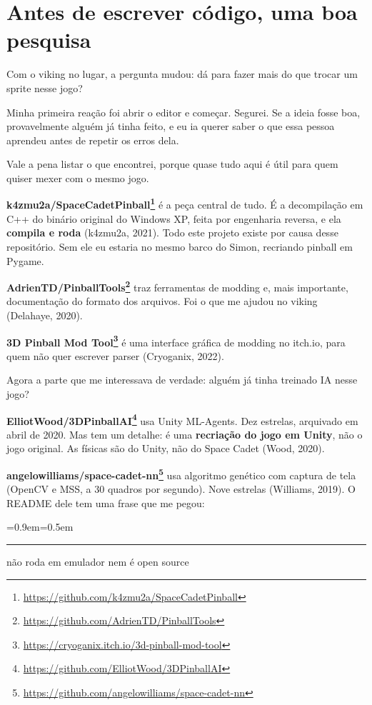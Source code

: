 \documentclass[10pt,a4paper,twoside,twocolumn]{scrartcl}
\renewcommand{\href}[2]{#2\footnote{\raggedright\tiny\sloppy
  \hbadness=10000 \url{#1}}}
\renewenvironment{quote}
  {\begin{list}{}{\leftmargin=0.9em\rightmargin=0pt\topsep=0.5em}\item[]%
   \color{destaque}\itshape\small
   \hspace*{-0.9em}\rule[-0.4em]{1.2pt}{1.1em}\hspace{0.5em}\ignorespaces}
  {\end{list}}
\begin{document}
\section{Antes de escrever código, uma boa
pesquisa}\label{antes-de-escrever-cuxf3digo-uma-boa-pesquisa}

Com o viking no lugar, a pergunta mudou: dá para fazer mais do que
trocar um sprite nesse jogo?

Minha primeira reação foi abrir o editor e começar. Segurei. Se a ideia
fosse boa, provavelmente alguém já tinha feito, e eu ia querer saber o
que essa pessoa aprendeu antes de repetir os erros dela.

Vale a pena listar o que encontrei, porque quase tudo aqui é útil para
quem quiser mexer com o mesmo jogo.

\textbf{\href{https://github.com/k4zmu2a/SpaceCadetPinball}{k4zmu2a/SpaceCadetPinball}}
é a peça central de tudo. É a decompilação em C++ do binário original do
Windows XP, feita por engenharia reversa, e ela \textbf{compila e roda}
({k4zmu2a}, 2021). Todo este projeto existe por causa desse repositório.
Sem ele eu estaria no mesmo barco do Simon, recriando pinball em Pygame.

\textbf{\href{https://github.com/AdrienTD/PinballTools}{AdrienTD/PinballTools}}
traz ferramentas de modding e, mais importante, documentação do formato
dos arquivos. Foi o que me ajudou no viking (Delahaye, 2020).

\textbf{\href{https://cryoganix.itch.io/3d-pinball-mod-tool}{3D Pinball
Mod Tool}} é uma interface gráfica de modding no itch.io, para quem não
quer escrever parser (Cryoganix, 2022).

Agora a parte que me interessava de verdade: alguém já tinha treinado IA
nesse jogo?

\textbf{\href{https://github.com/ElliotWood/3DPinballAI}{ElliotWood/3DPinballAI}}
usa Unity ML-Agents. Dez estrelas, arquivado em abril de 2020. Mas tem
um detalhe: é uma \textbf{recriação do jogo em Unity}, não o jogo
original. As físicas são do Unity, não do Space Cadet (Wood, 2020).

\textbf{\href{https://github.com/angelowilliams/space-cadet-nn}{angelowilliams/space-cadet-nn}}
usa algoritmo genético com captura de tela (OpenCV e MSS, a 30 quadros
por segundo). Nove estrelas (Williams, 2019). O README dele tem uma
frase que me pegou:

\begin{quote}
não roda em emulador nem é open source
\end{quote}
\end{document}
